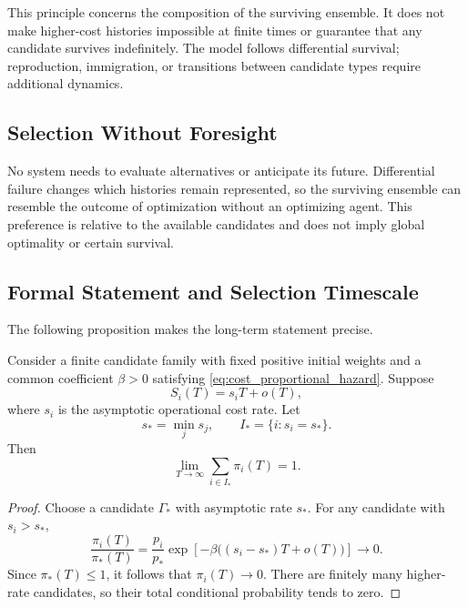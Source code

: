 This principle concerns the composition of the surviving ensemble.
It does not make higher-cost histories impossible at finite times
or guarantee that any candidate survives indefinitely. The model
follows differential survival; reproduction, immigration, or
transitions between candidate types require additional dynamics.

\subsection{Selection Without Foresight}
\label{subsec:teleology}

No system needs to evaluate alternatives or anticipate its future.
Differential failure changes which histories remain represented,
so the surviving ensemble can resemble the outcome of optimization
without an optimizing agent. This preference is relative to the
available candidates and does not imply global optimality or
certain survival.

\subsection{Formal Statement and Selection Timescale}
\label{subsec:minimum_action_as_survivorship}

The following proposition makes the long-term statement precise.

\begin{proposition}
Consider a finite candidate family with fixed positive initial
weights and a common coefficient $\beta>0$ satisfying
\cref{eq:cost_proportional_hazard}. Suppose
\begin{equation}
\label{eq:asymptotic_action}
    S_i(T)=s_iT+o(T),
\end{equation}
where $s_i$ is the asymptotic operational cost rate. Let
\[
    s_*=\min_j s_j,
    \qquad
    I_*=\{i:s_i=s_*\}.
\]
Then
\begin{equation}
\label{eq:selection_principle}
    \lim_{T\to\infty}\sum_{i\in I_*}\pi_i(T)=1.
\end{equation}
\end{proposition}

\begin{proof}
Choose a candidate $\Gamma_*$ with asymptotic rate $s_*$.
For any candidate with $s_i>s_*$,
\[
    \frac{\pi_i(T)}{\pi_*(T)}
    =
    \frac{p_i}{p_*}
    \exp\!\left[-\beta\bigl((s_i-s_*)T+o(T)\bigr)\right]
    \longrightarrow0.
\]
Since $\pi_*(T)\leq1$, it follows that $\pi_i(T)\to0$.
There are finitely many higher-rate candidates, so their
total conditional probability tends to zero.
\end{proof}

